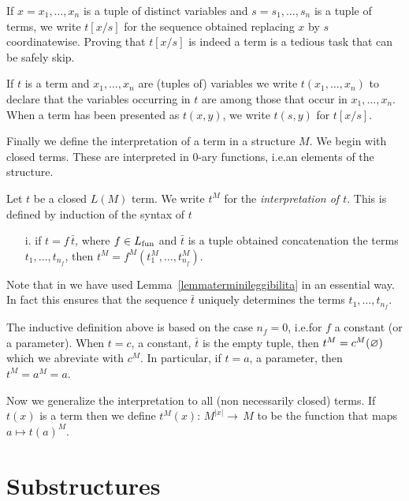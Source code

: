 If $x=x_1,\dots,x_n$ is a tuple of distinct variables and $s=s_1,\dots,s_n$ is a tuple of terms, we write \emph{$t[x/s]$\/} for the sequence obtained replacing $x$ by $s$ coordinatewise. Proving that $t[x/s]$ is indeed a term is a tedious task that can be safely skip.

If $t$ is a term and $x_1,\dots,x_n$ are (tuples of) variables we write \emph{$t(x_1,\dots,x_n)$\/} to declare that the variables occurring in $t$ are among those that occur in $x_1,\dots,x_n$. When a term has been presented as $t(x,y)$, we write \emph{$t(s,y)$\/} for $t[x/s]$.

Finally we define the interpretation of a term in a structure $M$. We begin with closed terms. These are interpreted in $0$-ary functions, i.e.\@ an elements of the structure.

\begin{definition}\label{defterminiinterpretazione}
Let $t$ be a closed $L(M)$ term. We write \emph{$t^M$} for the \emph{interpretation of $t$}. This is defined by induction of the syntax of $t$

\begin{itemize}
\item[i.] if $t=f\,\bar t$, where $f\in L_{\rm fun}$ and $\bar t$ is a tuple obtained concatenation the terms $t_1,\dots,t_{n_f}$, then $t^M=f^M(t^M_1, \dots, t^M_{n_f})$.
\end{itemize}
Note that in  we have used Lemma~\ref{lemmaterminileggibilita} in an essential way. In fact this ensures that the sequence $\bar t$ uniquely determines the terms $t_1, \dots, t_{n_f}$.\QED
\end{definition}

The inductive definition above is based on the case $n_f=0$, i.e.\@ for $f$ a constant (or a parameter).  When $t=c$, a constant, $\bar t$ is the empty tuple, then $t^M=c^M(\varnothing)$ which we abreviate with $c^M$. In particular, if $t=a$, a parameter, then $t^M=a^M=a$.

Now we generalize the interpretation to all (non necessarily closed) terms. If $t(x)$ is a term then we define \emph{$t^M\!(x) :\,M^{|x|}\to\, M$} to be the function that maps $a\mapsto t(a)^M$.

\section{Substructures}
\label{sottostrutture}


